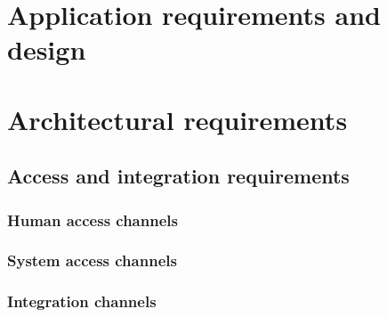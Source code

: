 \documentclass[a4paper,12pt,titlepage]{article}
\begin{document}


\tableofcontents
\newpage


\section{Application requirements and design}




\newpage

\newpage




\newpage
\section{Architectural requirements}
	
	\subsection{Access and integration requirements}
			\subsubsection{Human access channels}	
				
			\subsubsection{System access channels}
					
			\subsubsection{Integration channels}
				
				
\end{document}
